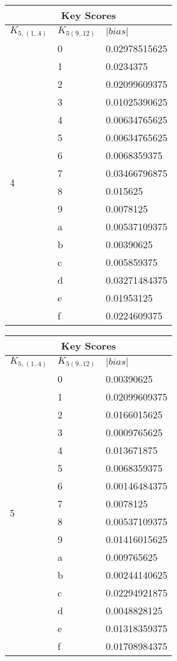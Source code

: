 \documentclass{elsart}
\begin{document}
\begin{tabular}{|l|l|l|}
\hline
\multicolumn{3}{|c|}{Key Scores} \\
\hline
$K_{5,(1..4)}$ & $K_{5(9..12)}$ & $|bias|$  \\ \hline
\multirow{16}{*}{4} & 0 & 0.02978515625 \\
 & 1 & 0.0234375 \\
 & 2 & 0.02099609375 \\
 & 3 & 0.01025390625 \\
 & 4 & 0.00634765625 \\
 & 5 & 0.00634765625 \\
 & 6 & 0.0068359375 \\
 & 7 & 0.03466796875 \\
 & 8 & 0.015625 \\
 & 9 & 0.0078125 \\
 & a & 0.00537109375 \\
 & b & 0.00390625 \\
 & c & 0.005859375 \\
 & d & 0.03271484375 \\
 & e & 0.01953125 \\
 & f & 0.0224609375 \\ \hline
\end{tabular}
\begin{tabular}{|l|l|l|}
\hline
\multicolumn{3}{|c|}{Key Scores} \\
\hline
$K_{5,(1..4)}$ & $K_{5(9..12)}$ & $|bias|$  \\ \hline
 \multirow{16}{*}{5} & 0 & 0.00390625 \\
 & 1 & 0.02099609375 \\
 & 2 & 0.0166015625 \\
 & 3 & 0.0009765625 \\
 & 4 & 0.013671875 \\
 & 5 & 0.0068359375 \\
 & 6 & 0.00146484375 \\
 & 7 & 0.0078125 \\
 & 8 & 0.00537109375 \\
 & 9 & 0.01416015625 \\
 & a & 0.009765625 \\
 & b & 0.00244140625 \\
 & c & 0.02294921875 \\
 & d & 0.0048828125 \\
 & e & 0.01318359375 \\
 & f & 0.01708984375 \\ \hline
\end{tabular}
\end{document}
